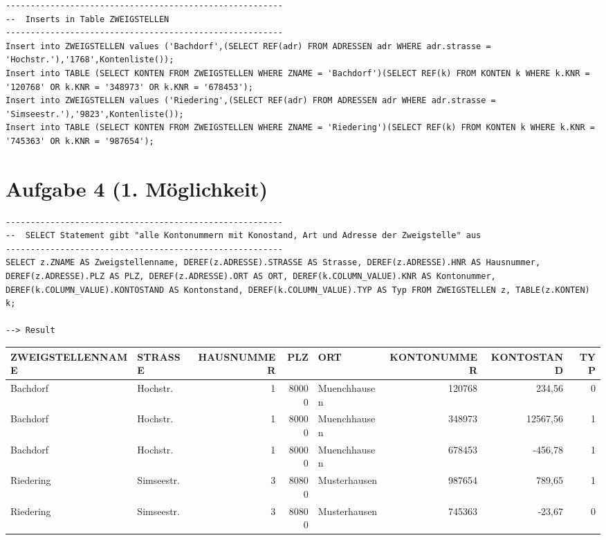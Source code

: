 \documentclass{scrartcl}
\begin{document}
\begin{landscape}
\begin{lstlisting}
\end{lstlisting}
\begin{lstlisting}
--------------------------------------------------------
--  Inserts in Table ZWEIGSTELLEN
--------------------------------------------------------
Insert into ZWEIGSTELLEN values ('Bachdorf',(SELECT REF(adr) FROM ADRESSEN adr WHERE adr.strasse = 'Hochstr.'),'1768',Kontenliste());
Insert into TABLE (SELECT KONTEN FROM ZWEIGSTELLEN WHERE ZNAME = 'Bachdorf')(SELECT REF(k) FROM KONTEN k WHERE k.KNR = '120768' OR k.KNR = '348973' OR k.KNR = '678453');
Insert into ZWEIGSTELLEN values ('Riedering',(SELECT REF(adr) FROM ADRESSEN adr WHERE adr.strasse = 'Simseestr.'),'9823',Kontenliste());
Insert into TABLE (SELECT KONTEN FROM ZWEIGSTELLEN WHERE ZNAME = 'Riedering')(SELECT REF(k) FROM KONTEN k WHERE k.KNR = '745363' OR k.KNR = '987654');
\end{lstlisting}
\section*{Aufgabe 4 (1. Möglichkeit)}
\begin{lstlisting}
--------------------------------------------------------
--  SELECT Statement gibt "alle Kontonummern mit Konostand, Art und Adresse der Zweigstelle" aus
--------------------------------------------------------
SELECT z.ZNAME AS Zweigstellenname, DEREF(z.ADRESSE).STRASSE AS Strasse, DEREF(z.ADRESSE).HNR AS Hausnummer, DEREF(z.ADRESSE).PLZ AS PLZ, DEREF(z.ADRESSE).ORT AS ORT, DEREF(k.COLUMN_VALUE).KNR AS Kontonummer, DEREF(k.COLUMN_VALUE).KONTOSTAND AS Kontonstand, DEREF(k.COLUMN_VALUE).TYP AS Typ FROM ZWEIGSTELLEN z, TABLE(z.KONTEN) k;

--> Result
\end{lstlisting}

\begin{tabular}{ l l r r l r r r }
ZWEIGSTELLENNAME & STRASSE & HAUSNUMMER & PLZ & ORT & KONTONUMMER & KONTOSTAND & TYP \\
\hline
Bachdorf   & Hochstr.   & 1  &  80000&  Muenchhausen    & 120768     & 234,56   &    0 \\
Bachdorf   &        Hochstr. &  1  & 80000& Muenchhausen  &   348973   & 12567,56  &     1 \\
Bachdorf   &        Hochstr.  & 1  & 80000 & Muenchhausen  &   678453   &  -456,78  &     1 \\
Riedering  &        Simseestr.& 3  & 80800 & Musterhausen  &   987654   &   789,65   &    1 \\
Riedering  &        Simseestr. & 3 &  80800 & Musterhausen  &   745363   &   -23,67  &     0 \\
\end{tabular}



\end{landscape}
\end{document}

